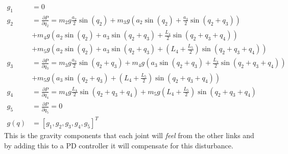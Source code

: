  \begin{align*}
    g_1 &= 0
    \\
    g_2 &= \frac{\partial P}{\partial q_2} = 
    m_2g\frac{a_2}{2}\sin{(q_2)}+
    m_3g\left( a_2 \sin{(q_2)} + \frac{a_3}{2}\sin{(q_2+q_3)} \right)\\&+
    m_4g\left( a_2 \sin{(q_2)} + a_3\sin{(q_2 + q_3)} + \frac{L_4}{2}\sin{(q_2+q_3+q_4)} \right)\\&+
    m_5g\left( a_2 \sin{(q_2)} + a_3\sin{(q_2 + q_3)} + \left(L_4 + \frac{L_5}{2} \right)\sin{(q_2+q_3+q_4)} \right)
    \\
    g_3 &= \frac{\partial P}{\partial q_3} =
    m_3g\frac{a_3}{2}\sin{(q_2+q_3)} +
    m_4g\left( a_3\sin{(q_2 + q_3)} + \frac{L_4}{2}\sin{(q_2+q_3+q_4)} \right)\\&+
    m_5g\left(  a_3\sin{(q_2 + q_3)} + \left(L_4 + \frac{L_5}{2} \right)\sin{(q_2+q_3+q_4)} \right)
    \\
    g_4 &=\frac{\partial P}{\partial q_4} = 
    m_4g\frac{L_4}{2}\sin{(q_2+q_3+q_4)}+
    m_5g\left(L_4 + \frac{L_5}{2} \right)\sin{(q_2+q_3+q_4)}
    \\
    g_5 &= \frac{\partial P}{\partial q_5} = 0
    \\
    g(q) &= [g_1,g_2,g_3,g_4,g_5]^T
 \end{align*}
This is the gravity components that each joint will \textit{feel} from the other links and by adding this to a PD controller it will compensate for this disturbance. 

